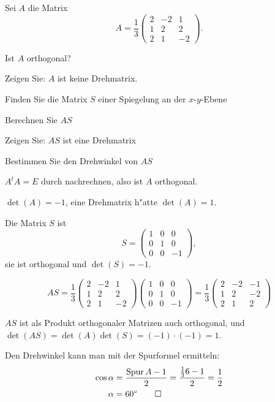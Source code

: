 Sei $A$ die Matrix
\[
A=\frac13\begin{pmatrix}
2&-2& 1\\
1& 2& 2\\
2& 1&-2
\end{pmatrix}.
\]
\begin{teilaufgaben}
\item Ist $A$ orthogonal?
\item Zeigen Sie: $A$ ist keine Drehmatrix.
\item Finden Sie die Matrix $S$ einer Spiegelung an der $x$-$y$-Ebene
\item Berechnen Sie $AS$
\item Zeigen Sie: $AS$ ist eine Drehmatrix
\item Bestimmen Sie den Drehwinkel von $AS$
\end{teilaufgaben}

\begin{loesung}
\begin{teilaufgaben}
\item $A^tA=E$ durch nachrechnen, also ist $A$ orthogonal.
\item $\det(A)=-1$, eine Drehmatrix h"atte $\det(A)=1$.
\item Die Matrix $S$ ist
\[
S=\begin{pmatrix}1&0&0\\0&1&0\\0&0&-1\end{pmatrix},
\]
sie ist orthogonal und $\det(S)=-1$.
\item
\[
AS=\frac13\begin{pmatrix}
2&-2& 1\\
1& 2& 2\\
2& 1&-2
\end{pmatrix}
\begin{pmatrix}1&0&0\\0&1&0\\0&0&-1\end{pmatrix}
=
\frac13\begin{pmatrix}
2&-2&-1\\
1& 2&-2\\
2& 1& 2
\end{pmatrix}
\]
\item $AS$ ist als Produkt orthogonaler Matrizen auch orthogonal,
und $\det(AS)=\det(A)\det(S)=(-1)\cdot(-1)=1$.
\item Den Drehwinkel kann man mit der Spurformel ermitteln:
\begin{align*}
\cos\alpha&= \frac{\operatorname{Spur} A -1}2=\frac{\frac136-1}2=\frac12
\\
\alpha&=60^\circ
\qedhere
\end{align*}
\end{teilaufgaben}
\end{loesung}

